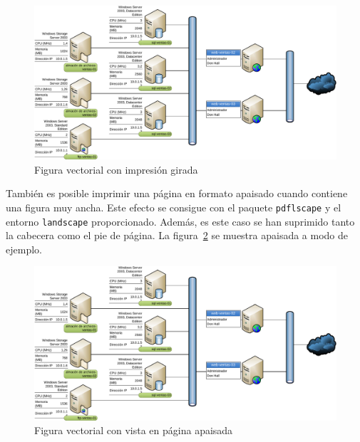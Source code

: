 \begin{figure}
	\centering
	\includegraphics[width=0.98\textheight]{./pics/network} 
	\caption[Gráfico girado]{Figura vectorial con impresión girada}
	\label{fig:girada}
\end{figure}


\begin{landscape}
\thispagestyle{empty}
También es posible imprimir una página en formato apaisado cuando contiene una figura muy ancha. Este efecto se consigue con el paquete \texttt{pdflscape} y el entorno \texttt{landscape} proporcionado. Además, es este caso se han suprimido tanto la cabecera como el pie de página. La figura~\ref{fig:apaisada} se muestra apaisada a modo de ejemplo.

\begin{figure}[H]
	\centering
	\includegraphics[width=\linewidth]{./pics/network} 
	\caption[Gráfico apaisado]{Figura vectorial con vista en página apaisada}
	\label{fig:apaisada}
\end{figure}
\end{landscape}


